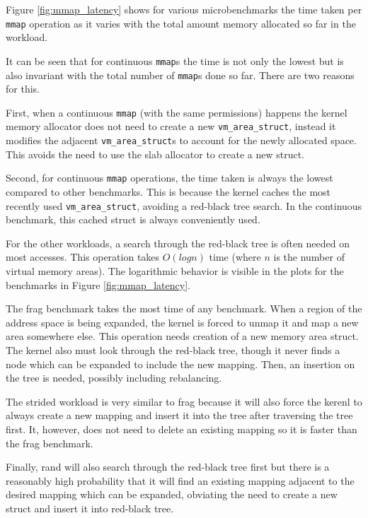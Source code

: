 \documentclass[twocolumn,11pt]{article}
\begin{document}
Figure \ref{fig:mmap_latency} shows for various microbenchmarks the time taken
per \texttt{mmap} operation as it varies with the total amount memory allocated
so far in the workload. 

It can be seen that for continuous \texttt{mmap}s the time is not only the
lowest but is also invariant with the total number of \texttt{mmap}s done so
far. There are two reasons for this. 

First, when a continuous \texttt{mmap} (with the same permissions) happens the
kernel memory allocator does not need to create a new \texttt{vm\_area\_struct},
instead it modifies the adjacent \texttt{vm\_area\_struct}s to account for the
newly allocated space. This avoids the need to use the slab allocator to create
a new struct. 

Second, for continuous \texttt{mmap} operations, the time taken is always the
lowest compared to other benchmarks.  This is because the kernel caches the most
recently used \texttt{vm\_area\_struct}, avoiding a red-black tree search. In
the continuous benchmark, this cached struct is always conveniently used.

For the other workloads, a search through the red-black tree is often needed on
most accesses. This operation takes $O(log n)$ time (where $n$ is the number of
virtual memory areas). The logarithmic behavior is visible in the plots for the
benchmarks in Figure \ref{fig:mmap_latency}.

The frag benchmark takes the most time of any benchmark. When a region of the
address space is being expanded, the kernel is forced to unmap it and map a new
area somewhere else.  This operation needs creation of a new memory area struct.
The kernel also must look through the red-black tree, though it never finds a
node which can be expanded to include the new mapping. Then, an insertion on the
tree is needed, possibly including rebalancing.

The strided workload is very similar to frag because it will also force the
kerenl to always create a new mapping and insert it into the tree after
traversing the tree first. It, however, does not need to delete an existing
mapping so it is faster than the frag benchmark. 

Finally, rand will also search through the red-black tree first but there is a
reasonably high probability that it will find an existing mapping adjacent to
the desired mapping which can be expanded, obviating the need to create a new
struct and insert it into red-black tree.
\end{document}
